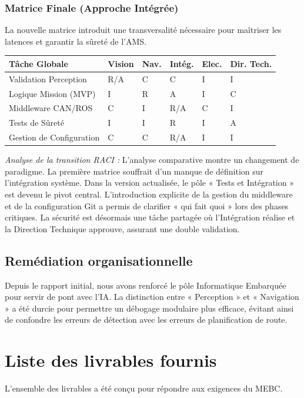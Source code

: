 \documentclass[11pt, a4paper]{article}
\begin{document}
\subsubsection{Matrice Finale (Approche Intégrée)}
La nouvelle matrice introduit une transversalité nécessaire pour maîtriser les latences et garantir la sûreté de l'AMS.
\begin{center}
\small
\begin{tabularx}{\textwidth}{lXXXXX}
\toprule
\textbf{Tâche Globale} & \textbf{Vision} & \textbf{Nav.} & \textbf{Intég.} & \textbf{Elec.} & \textbf{Dir. Tech.} \\
\midrule
Validation Perception & R/A & C & C & I & I \\
Logique Mission (MVP) & I & R & A & I & C \\
Middleware CAN/ROS & C & I & R/A & C & I \\
Tests de Sûreté & I & I & R & I & A \\
Gestion de Configuration & C & C & R/A & I & I \\
\bottomrule
\end{tabularx}
\end{center}

\medskip
\textit{Analyse de la transition RACI :} L'analyse comparative montre un changement de paradigme. La première matrice souffrait d'un manque de définition sur l'intégration système. Dans la version actualisée, le pôle « Tests et Intégration » est devenu le pivot central. L'introduction explicite de la gestion du middleware et de la configuration Git a permis de clarifier « qui fait quoi » lors des phases critiques. La sécurité est désormais une tâche partagée où l'Intégration réalise et la Direction Technique approuve, assurant une double validation.

\subsection{Remédiation organisationnelle}
Depuis le rapport initial, nous avons renforcé le pôle Informatique Embarquée pour servir de pont avec l'IA. La distinction entre « Perception » et « Navigation » a été durcie pour permettre un débogage modulaire plus efficace, évitant ainsi de confondre les erreurs de détection avec les erreurs de planification de route.


\section{Liste des livrables fournis}
L'ensemble des livrables a été conçu pour répondre aux exigences du MEBC.
\end{document}
